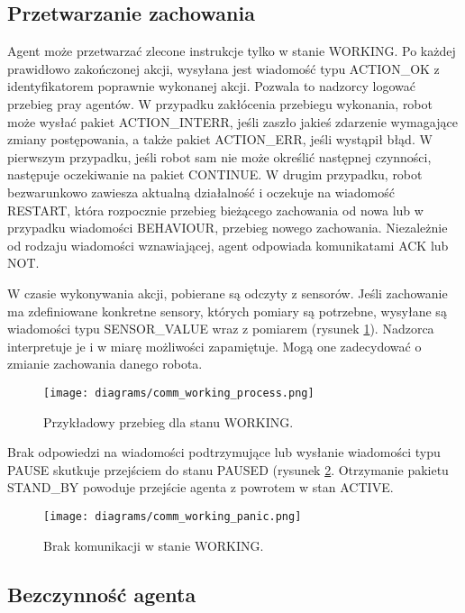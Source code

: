 \subsection{Przetwarzanie zachowania}

Agent może przetwarzać zlecone instrukcje tylko w stanie WORKING. Po każdej prawidłowo zakończonej akcji, wysyłana jest wiadomość typu ACTION\_OK z identyfikatorem poprawnie wykonanej akcji. Pozwala to nadzorcy logować przebieg pray agentów. W przypadku zakłócenia przebiegu wykonania, robot może wysłać pakiet ACTION\_INTERR, jeśli zaszło jakieś zdarzenie wymagające zmiany postępowania, a także pakiet ACTION\_ERR, jeśli wystąpił błąd. W pierwszym przypadku, jeśli robot sam nie może określić następnej czynności, następuje oczekiwanie na pakiet CONTINUE. W drugim przypadku, robot bezwarunkowo zawiesza aktualną działalność i oczekuje na wiadomość RESTART, która rozpocznie przebieg bieżącego zachowania od nowa lub w przypadku wiadomości BEHAVIOUR, przebieg nowego zachowania. Niezależnie od rodzaju wiadomości wznawiającej, agent odpowiada komunikatami ACK lub NOT.

W czasie wykonywania akcji, pobierane są odczyty z sensorów. Jeśli zachowanie ma zdefiniowane konkretne sensory, których pomiary są potrzebne, wysyłane są wiadomości typu SENSOR\_VALUE wraz z pomiarem (rysunek \ref{fig:comm_working_process}). Nadzorca interpretuje je i w miarę możliwości zapamiętuje. Mogą one zadecydować o zmianie zachowania danego robota.

\begin{figure}[!ht]
    \centering
        \texttt{[image: diagrams/comm\_working\_process.png]}
    \caption{Przykładowy przebieg dla stanu WORKING.\label{fig:comm_working_process}}
\end{figure}

Brak odpowiedzi na wiadomości podtrzymujące lub wysłanie wiadomości typu PAUSE skutkuje przejściem do stanu PAUSED (rysunek \ref{fig:comm_working_panic}. Otrzymanie pakietu STAND\_BY powoduje przejście agenta z powrotem w stan ACTIVE.

\begin{figure}[!ht]
    \centering
        \texttt{[image: diagrams/comm\_working\_panic.png]}
    \caption{Brak komunikacji w stanie WORKING.\label{fig:comm_working_panic}}
\end{figure}

\subsection{Bezczynność agenta}

